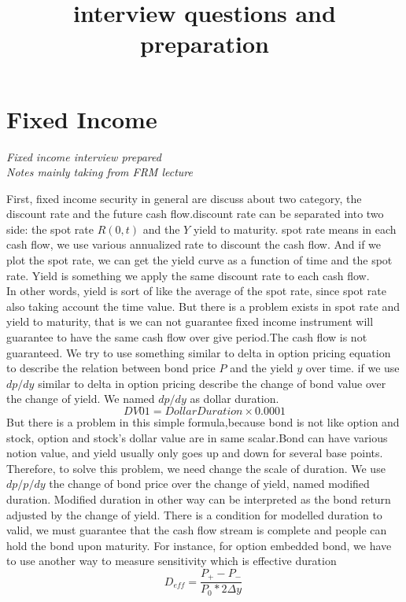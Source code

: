 \documentclass[a4paper,11pt]{article}
\title {interview questions and preparation}
\begin{document}
 \pagestyle{empty} \setlength{\textwidth}{28cm}
 \setlength{\tabcolsep}{0.1cm}
\marginsize{2cm}{1cm}{1cm}{1cm} \setlength{\baselineskip}{19pt}


\section{Fixed Income}
\begin{centering}
\em{Fixed income interview prepared\\
Notes mainly taking from FRM lecture}
\end{centering}

First, fixed income security in general are discuss about two category,
the discount rate and the future cash flow.discount rate can be separated into two side:
the spot rate $R(0,t)$ and the $Y$ yield to maturity. spot rate means in each cash flow,
 we use various annualized rate to discount the cash flow. And if we plot the spot rate,
we can get the yield curve as a function of time and the spot rate. Yield is something
we apply the same discount rate to each cash flow.\\
In other words, yield is sort of like the average of the spot rate, since spot rate also
taking account the time value. But there is a problem exists in spot rate and yield to maturity,
that is we can not guarantee fixed income instrument will guarantee to have the
same cash flow over give period.The cash flow is not guaranteed.
We try to use something similar to delta in option pricing equation to describe the
relation between bond price $P$ and the yield $y$ over time. if we use $dp/dy$ similar
to delta in option pricing describe the change of bond value over the change of yield.
 We named $dp/dy$ as dollar duration.
\begin{equation}
DV01=Dollar Duration\times 0.0001
\end{equation}
But there is a problem in this simple formula,because bond is not like option and stock,
 option and stock's dollar value are in same scalar.Bond can have various notion value,
and yield usually only goes up and down for several base points.\\
Therefore, to solve this problem, we need change the scale of duration. We use $dp/p/dy$ the change of bond price
over the change of yield, named modified duration. Modified duration in other way can be interpreted as
the bond return adjusted by the change of yield. There is a condition for modelled duration to  valid,
we must guarantee that the cash flow stream is complete and people can hold the bond upon maturity.
For instance, for option embedded bond, we have to use another way to measure sensitivity which is effective
duration
\begin{equation}
D_{eff} =\frac{P_+-P_-}{P_0*2\Delta y}\
 \end{equation}
\end{document}
